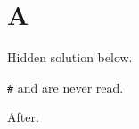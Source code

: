 \documentclass[solutions=hide]{akizumi-note}
\begin{document}
\section{A}
\begin{exercise}Hidden solution below.\end{exercise}
\begin{solution}
\verb|#| and \undefinedmacro are never read.
\end{solution}
After.
\end{document}
